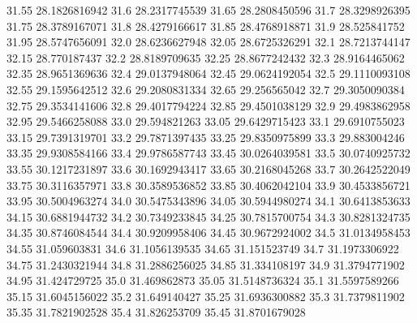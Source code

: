           31.55    28.1826816942
           31.6    28.2317745539
          31.65    28.2808450596
           31.7    28.3298926395
          31.75    28.3789167071
           31.8    28.4279166617
          31.85    28.4768918871
           31.9     28.525841752
          31.95    28.5747656091
           32.0    28.6236627948
          32.05    28.6725326291
           32.1    28.7213744147
          32.15     28.770187437
           32.2    28.8189709635
          32.25    28.8677242432
           32.3    28.9164465062
          32.35    28.9651369636
           32.4    29.0137948064
          32.45    29.0624192054
           32.5    29.1110093108
          32.55    29.1595642512
           32.6    29.2080831334
          32.65     29.256565042
           32.7    29.3050090384
          32.75    29.3534141606
           32.8    29.4017794224
          32.85    29.4501038129
           32.9    29.4983862958
          32.95    29.5466258088
           33.0     29.594821263
          33.05    29.6429715423
           33.1    29.6910755023
          33.15    29.7391319701
           33.2    29.7871397435
          33.25    29.8350975899
           33.3     29.883004246
          33.35    29.9308584166
           33.4    29.9786587743
          33.45    30.0264039581
           33.5    30.0740925732
          33.55    30.1217231897
           33.6    30.1692943417
          33.65    30.2168045268
           33.7    30.2642522049
          33.75    30.3116357971
           33.8    30.3589536852
          33.85    30.4062042104
           33.9    30.4533856721
          33.95    30.5004963274
           34.0    30.5475343896
          34.05    30.5944980274
           34.1    30.6413853633
          34.15    30.6881944732
           34.2    30.7349233845
          34.25    30.7815700754
           34.3    30.8281324735
          34.35    30.8746084544
           34.4    30.9209958406
          34.45    30.9672924002
           34.5    31.0134958453
          34.55     31.059603831
           34.6    31.1056139535
          34.65     31.151523749
           34.7    31.1973306922
          34.75    31.2430321944
           34.8    31.2886256025
          34.85     31.334108197
           34.9    31.3794771902
          34.95     31.424729725
           35.0     31.469862873
          35.05    31.5148736324
           35.1    31.5597589266
          35.15    31.6045156022
           35.2     31.649140427
          35.25    31.6936300882
           35.3    31.7379811902
          35.35    31.7821902528
           35.4     31.826253709
          35.45    31.8701679028
